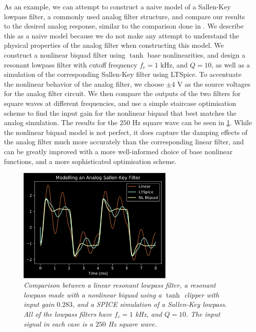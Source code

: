 \documentclass[twoside,a4paper]{article}
\begin{document}
As an example, we can attempt to construct a naive model of a Sallen-Key
lowpass filter, a commonly used analog filter structure, and compare
our results to the desired analog response, similar to the
comparison done in \cite{SKF}. We describe this
as a naive model because we do not make any attempt to understand the physical
properties of the analog filter when constructing this model. We construct
a nonlinear biquad filter using $\tanh$ base nonlinearities, and design a
resonant lowpass filter with cutoff frequency $f_c = 1 \text{ kHz}$,
and $Q=10$, as well as a simulation of the corresponding Sallen-Key
filter using LTSpice. To accentuate the nonlinear behavior of the analog
filter, we choose $\pm 4 \text{ V}$ as the source voltages for the analog
filter circuit.
\newline\newline
We then compare the outputs of the two filters
for square waves at different frequencies, and use a simple staircase
optimisation scheme to find the input gain for the nonlinear biquad
that best matches the analog simulation. The results for the $250 \text{ Hz}$
square wave can be seen in \cref{SPICE}. While the nonlinear biquad model
is not perfect, it does capture the damping effects of the analog filter
much more accurately than the corresponding linear filter, and can be greatly
improved with a more well-informed choice of base nonlinear functions, and
a more sophisticated optimisation scheme.
%
\begin{figure}[ht]
    \center
    \includegraphics[width=3in]{../Pics/Spice-Compare.png}
    \caption{\label{SPICE}{\it Comparison between a linear resonant lowpass
                            filter, a resonant lowpass made with a nonlinear biquad
                            using a $\tanh$ clipper with input gain $0.283$,
                            and a SPICE simulation of a Sallen-Key lowpass.
                            All of the lowpass filters have $f_c=1$ kHz, and
                            $Q=10$. The input signal in each case is a $250$ Hz
                            square wave.}}
\end{figure}
%
\end{document}
